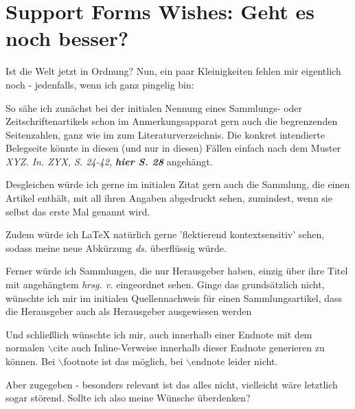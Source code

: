 %
%
%
%
\section{Support Forms Wishes: Geht es noch besser?}
Ist die Welt jetzt in Ordnung? Nun, ein paar Kleinigkeiten fehlen mir
eigentlich noch - jedenfalls, wenn ich ganz pingelig bin:

So sähe ich zunächst bei der initialen Nennung eines Sammlungs- oder
Zeitschriftenartikels schon im Anmerkungsapparat gern auch die begrenzenden
Seitenzahlen, ganz wie im zum Literaturverzeichnis. Die konkret
intendierte Belegseite könnte in diesen (und nur in diesen) Fällen einfach nach
dem Muster {\itshape XYZ. In. ZYX, S. 24-42, {\bfseries hier S. 28}} angehängt.

Desgleichen würde ich gerne im initialen Zitat gern auch die Sammlung, die einen
Artikel enthält, mit all ihren Angaben abgedruckt sehen, zumindest, wenn sie
selbst das erste Mal genannt wird.

Zudem würde ich LaTeX natürlich gerne 'flektierend kontextsensitiv'
sehen, sodass meine neue Abkürzung {\itshape ds.} überflüssig würde.

Ferner würde ich Sammlungen, die nur Herausgeber haben, einzig über ihre Titel
mit angehängtem {\itshape hrsg. v.} eingeordnet sehen. Ginge das grundsätzlich
nicht, wünschte ich mir im initialen Quellennachweis für einen Sammlungsartikel,
dass die Herausgeber auch als Herausgeber ausgewiesen werden 

Und schließlich wünschte ich mir, auch innerhalb einer Endnote mit dem normalen
$\backslash$cite auch Inline-Verweise innerhalb dieser Endnote generieren zu
können. Bei $\backslash$footnote ist das möglich, bei $\backslash$endnote leider
nicht.

Aber zugegeben - besonders relevant ist das alles nicht, vielleicht wäre
letztlich sogar störend. Sollte ich also meine Wünsche überdenken?

%
